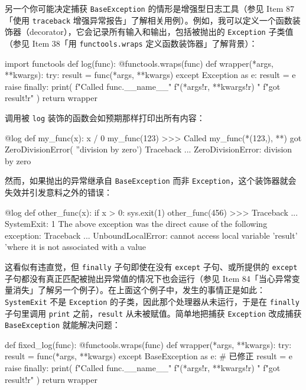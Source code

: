 另一个你可能决定捕获 \texttt{BaseException} 的情形是增强型日志工具（参见 Item 87「使用 \texttt{traceback} 增强异常报告」了解相关用例）。例如，我可以定义一个函数装饰器（decorator），它会记录所有输入和输出，包括被抛出的 \texttt{Exception} 子类值（参见 Item 38「用 \texttt{functools.wraps} 定义函数装饰器」了解背景）：

\begin{codebox}[python]
import functools
def log(func):
    @functools.wraps(func)
    def wrapper(*args, **kwargs):
        try:
            result = func(*args, **kwargs)
        except Exception as e:
            result = e
            raise
        finally:
            print(
                f"Called {func.__name__}"
                f"(*{args!r}, **{kwargs!r}) "
                f"got {result!r}"
            )
    return wrapper
\end{codebox}

调用被 \texttt{log} 装饰的函数会如预期那样打印出所有内容：

\begin{codebox}[python]
@log
def my_func(x):
    x / 0
my_func(123)
>>>
Called my_func(*(123,), **{}) got ZeroDivisionError(
''division by zero')
Traceback ...
ZeroDivisionError: division by zero
\end{codebox}

然而，如果抛出的异常继承自 \texttt{BaseException} 而非 \texttt{Exception}，这个装饰器就会失效并引发意料之外的错误：

\begin{codebox}[python]
@log
def other_func(x):
    if x > 0:
        sys.exit(1)
other_func(456)
>>>
Traceback ...
SystemExit: 1
The above exception was the direct cause of the following
exception:
Traceback ...
UnboundLocalError: cannot access local variable 'result'
'where it is not associated with a value
\end{codebox}

这看似有违直觉，但 \texttt{finally} 子句即使在没有 \texttt{except} 子句、或所提供的 \texttt{except} 子句都没有真正匹配被抛出异常值的情况下也会运行（参见 Item 84「当心异常变量消失」了解另一个例子）。在上面这个例子中，发生的事情正是如此：\texttt{SystemExit} 不是 \texttt{Exception} 的子类，因此那个处理器从未运行，于是在 \texttt{finally} 子句里调用 \texttt{print} 之前，\texttt{result} 从未被赋值。简单地把捕获 \texttt{Exception} 改成捕获 \texttt{BaseException} 就能解决问题：

\begin{codebox}[python]
def fixed_log(func):
    @functools.wraps(func)
    def wrapper(*args, **kwargs):
        try:
            result = func(*args, **kwargs)
        except BaseException as e:  # 已修正
            result = e
            raise
        finally:
            print(
                f"Called {func.__name__}"
                f"(*{args!r}, **{kwargs!r}) "
                f"got {result!r}"
            )
    return wrapper
\end{codebox}

